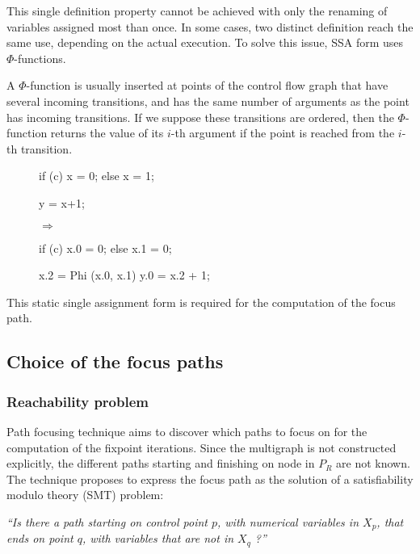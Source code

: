 \documentclass[a4paper,english,titlepage,11pt]{report}
\begin{document}
This single definition property cannot be achieved with only the renaming of
variables assigned most than once. In some cases, two distinct definition reach
the same use, depending on the actual execution. To solve this issue, SSA form
uses $\Phi$-functions.

A $\Phi$-function is usually inserted at points of the control flow graph that
have several incoming transitions, and has the same number of arguments as the point
has incoming transitions. If we suppose these transitions are ordered, then the
$\Phi$-function returns the value of its $i$-th argument if the point is reached
from the $i$-th transition.

\begin{figure}[!h]
\centering
\begin{minipage}[c]{.39\linewidth}
\begin{C}
if (c) x = 0;
else x = 1;

y = x+1;
\end{C}
\end{minipage} 
$\Longrightarrow$ \hfill
\begin{minipage}[c]{.49\linewidth}
\begin{C}
if (c) x.0 = 0;
else x.1 = 0;

x.2 = Phi (x.0, x.1)
y.0 = x.2 + 1;
\end{C}
\end{minipage}
\end{figure}
\FloatBarrier

This static single assignment form is required for the computation of the focus
path.

	\subsection{Choice of the focus paths}

	\subsubsection{Reachability problem}
	\label{reachability}
	Path focusing technique aims to discover which paths to focus on for the
	computation of the fixpoint iterations. 
	Since the multigraph is not constructed explicitly, the different paths
	starting and finishing on node in $P_R$ are not known. 
	The technique proposes to express the focus path as the solution of a
	satisfiability modulo theory (SMT) problem:

	\begin{center} \emph{
		``Is there a path starting on control point $p$, with numerical
		variables in $X_p$, that ends on point $q$, with variables that are not
		in $X_q$ ?''}
	\end{center}
\end{document}
